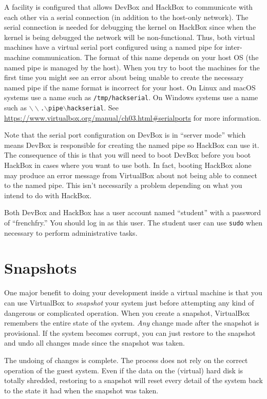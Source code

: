 \documentclass[twocolumn]{article}
\newcommand{\filename}[1]{\texttt{#1}}
\begin{document}
A facility is configured that allows DevBox and HackBox to communicate with each other via a
serial connection (in addition to the host-only network). The serial connection is needed for
debugging the kernel on HackBox since when the kernel is being debugged the network will be
non-functional. Thus, both virtual machines have a virtual serial port configured using a named
pipe for inter-machine communication. The format of this name depends on your host OS (the named
pipe is managed by the host). When you try to boot the machines for the first time you might see
an error about being unable to create the necessary named pipe if the name format is incorrect
for your host. On Linux and macOS systems use a name such as \filename{/tmp/hackserial}. On
Windows systems use a name such as
\filename{$\backslash\backslash$.$\backslash$pipe$\backslash$hackserial}. See
\url{https://www.virtualbox.org/manual/ch03.html#serialports} for more information.

Note that the serial port configuration on DevBox is in ``server mode'' which means DevBox is
responsible for creating the named pipe so HackBox can use it. The consequence of this is that
you will need to boot DevBox before you boot HackBox in cases where you want to use both. In
fact, booting HackBox alone may produce an error message from VirtualBox about not being able to
connect to the named pipe. This isn't necessarily a problem depending on what you intend to do
with HackBox.

Both DevBox and HackBox has a user account named ``student'' with a password of ``frenchfry.''
You should log in as this user. The student user can use \texttt{sudo} when necessary to perform
administrative tasks.

\section{Snapshots}
\label{sec:snapsots}

One major benefit to doing your development inside a virtual machine is that you can use
VirtualBox to \emph{snapshot} your system just before attempting any kind of dangerous or
complicated operation. When you create a snapshot, VirtualBox remembers the entire state of the
system. \emph{Any} change made after the snapshot is provisional. If the system becomes corrupt,
you can just restore to the snapshot and undo all changes made since the snapshot was taken.

The undoing of changes is complete. The process does not rely on the correct operation of the
guest system. Even if the data on the (virtual) hard disk is totally shredded, restoring to a
snapshot will reset every detail of the system back to the state it had when the snapshot was
taken.
\end{document}
